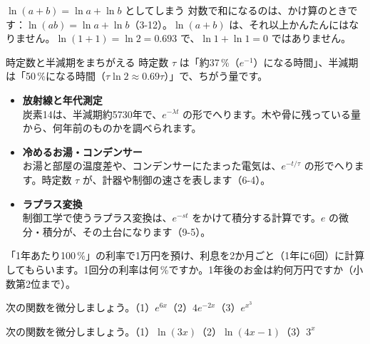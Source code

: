\begin{tsumazuki}{$\ln(a+b)=\ln a+\ln b$ としてしまう}
対数で和になるのは、かけ算のときです：$\ln(ab)=\ln a+\ln b$（3-12）。$\ln(a+b)$ は、それ以上かんたんにはなりません。$\ln(1+1)=\ln2=0.693$ で、$\ln1+\ln1=0$ ではありません。
\end{tsumazuki}

\begin{tsumazuki}{時定数と半減期をまちがえる}
時定数 $\tau$ は「約37\,\%（$e^{-1}$）になる時間」、半減期は「50\,\%になる時間（$\tau\ln2\approx0.69\tau$）」で、ちがう量です。
\end{tsumazuki}

\begin{butsuri}
\begin{itemize}[leftmargin=1.2\zw, itemsep=1pt, topsep=0pt, label={\color{bkPurple}●}]
\item \textbf{放射線と年代測定}\\炭素14は、半減期約5730年で、$e^{-\lambda t}$ の形でへります。木や骨に残っている量から、何年前のものかを調べられます。
\item \textbf{冷めるお湯・コンデンサー}\\お湯と部屋の温度差や、コンデンサーにたまった電気は、$e^{-t/\tau}$ の形でへります。時定数 $\tau$ が、計器や制御の速さを表します（6-4）。
\item \textbf{ラプラス変換}\\制御工学で使うラプラス変換は、$e^{-st}$ をかけて積分する計算です。$e$ の微分・積分が、その土台になります（9-5）。
\end{itemize}
\end{butsuri}


\bkendproblems
{}

\bkproblem 「1年あたり100\,\%」の利率で1万円を預け、利息を2か月ごと（1年に6回）に計算してもらいます。1回分の利率は何\,\%ですか。1年後のお金は約何万円ですか（小数第2位まで）。

\bkproblem 次の関数を微分しましょう。\quad（1）$e^{6x}$\quad（2）$4e^{-2x}$\quad（3）$e^{x^3}$

\bkproblem 次の関数を微分しましょう。\quad（1）$\ln(3x)$\quad（2）$\ln(4x-1)$\quad（3）$3^x$

